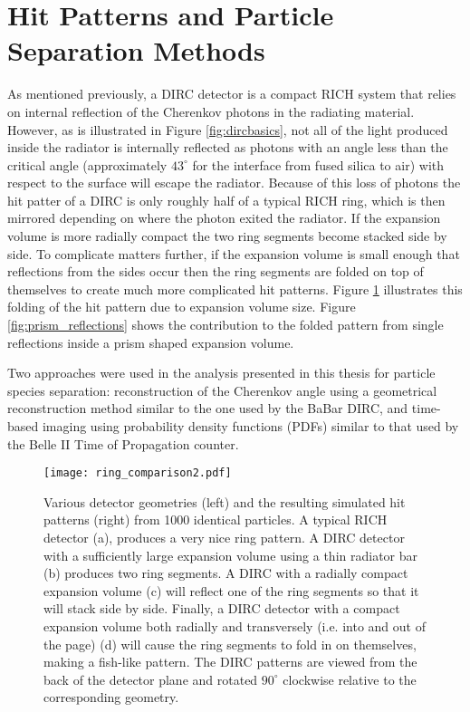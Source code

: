 \section{Hit Patterns and Particle Separation Methods}
As mentioned previously, a DIRC detector is a compact RICH system that relies on internal reflection of the Cherenkov photons in the radiating material. However, as is illustrated in Figure \ref{fig:dircbasics}, not all of the light produced inside the radiator is internally reflected as photons with an angle less than the critical angle (approximately $43^{\circ}$ for the interface from fused silica to air) with respect to the surface will escape the radiator. Because of this loss of photons the hit patter of a DIRC is only roughly half of a typical RICH ring, which is then mirrored depending on where the photon exited the radiator. If the expansion volume is more radially compact the two ring segments become stacked side by side. To complicate matters further, if the expansion volume is small enough that reflections from the sides occur then the ring segments are folded on top of themselves to create much more complicated hit patterns. Figure \ref{fig:ring_comparison2} illustrates this folding of the hit pattern due to expansion volume size. Figure \ref{fig:prism_reflections} shows the contribution to the folded pattern from single reflections inside a prism shaped expansion volume.

Two approaches were used in the analysis presented in this thesis for particle species separation: reconstruction of the Cherenkov angle using a geometrical reconstruction method similar to the one used by the BaBar DIRC, and time-based imaging using probability density functions (PDFs) similar to that used by the Belle II Time of Propagation counter.

\begin{figure}[H]
	\centering
	\texttt{[image: ring\_comparison2.pdf]}
	\caption{Various detector geometries (left) and the resulting simulated hit patterns (right) from 1000 identical particles. A typical RICH detector (a), produces a very nice ring pattern. A DIRC detector with a sufficiently large expansion volume using a thin radiator bar (b) produces two ring segments. A DIRC with a radially compact expansion volume (c) will reflect one of the ring segments so that it will stack side by side. Finally, a DIRC detector with a compact expansion volume both radially and transversely (i.e. into and out of the page) (d) will cause the ring segments to fold in on themselves, making a fish-like pattern. The DIRC patterns are viewed from the back of the detector plane and rotated $90^{\circ}$ clockwise relative to the corresponding geometry.}
	\label{fig:ring_comparison2}
\end{figure}


